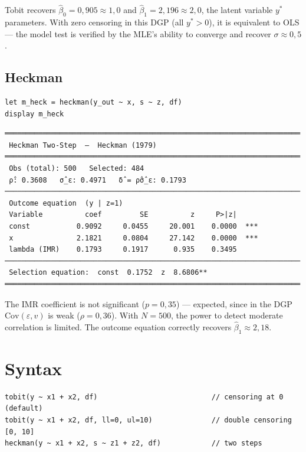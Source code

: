 Tobit recovers $\hat\beta_0 = 0{,}905 \approx 1{,}0$ and $\hat\beta_1 = 2{,}196 \approx 2{,}0$, the latent variable $y^*$ parameters. With zero censoring in this DGP (all $y^* > 0$), it is equivalent to OLS — the model test is verified by the MLE's ability to converge and recover $\sigma \approx 0{,}5$.

\subsection*{Heckman}

\begin{lstlisting}
let m_heck = heckman(y_out ~ x, s ~ z, df)
display m_heck
\end{lstlisting}

\begin{lstlisting}[language={}, basicstyle=\ttfamily\small,
  frame=none, numbers=none, backgroundcolor=\color{codbg},
  xleftmargin=0pt, xrightmargin=0pt, breaklines=false]
══════════════════════════════════════════════════════════════════════
 Heckman Two-Step  —  Heckman (1979)
══════════════════════════════════════════════════════════════════════
 Obs (total): 500   Selected: 484
 ρ̂: 0.3608   σ̂_ε: 0.4971   δ̂ = ρ̂σ̂_ε: 0.1793
──────────────────────────────────────────────────────────────────────
 Outcome equation  (y | z=1)
 Variable          coef         SE          z     P>|z|
 const           0.9092     0.0455     20.001    0.0000  ***
 x               2.1821     0.0804     27.142    0.0000  ***
 lambda (IMR)    0.1793     0.1917      0.935    0.3495
──────────────────────────────────────────────────────────────────────
 Selection equation:  const  0.1752  z  8.6806**
══════════════════════════════════════════════════════════════════════
\end{lstlisting}

The IMR coefficient is not significant ($p = 0{,}35$) — expected, since in the DGP $\mathrm{Cov}(\varepsilon, v)$ is weak ($\rho = 0{,}36$). With $N = 500$, the power to detect moderate correlation is limited. The outcome equation correctly recovers $\hat\beta_1 \approx 2{,}18$.

\section{Syntax}

\begin{lstlisting}
tobit(y ~ x1 + x2, df)                           // censoring at 0 (default)
tobit(y ~ x1 + x2, df, ll=0, ul=10)              // double censoring [0, 10]
heckman(y ~ x1 + x2, s ~ z1 + z2, df)            // two steps
\end{lstlisting}

